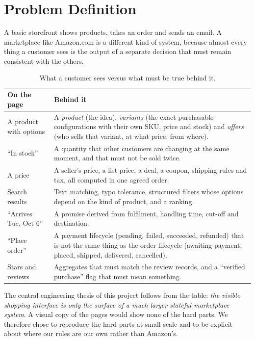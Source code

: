 \chapter{Problem Definition}
\label{ch:problem}

A basic storefront shows products, takes an order and sends an email. A marketplace like Amazon.com is a different kind of system, because almost every thing a customer sees is the output of a separate decision that must remain consistent with the others.

\begin{table}[H]
\centering
\caption{What a customer sees versus what must be true behind it.}
\label{tab:surface}
\small
\begin{tabularx}{\linewidth}{@{}lX@{}}
\toprule
On the page & Behind it \\
\midrule
A product with options & A \emph{product} (the idea), \emph{variants} (the exact purchasable configurations with their own SKU, price and stock) and \emph{offers} (who sells that variant, at what price, from where). \\
``In stock'' & A quantity that other customers are changing at the same moment, and that must not be sold twice. \\
A price & A seller's price, a list price, a deal, a coupon, shipping rules and tax, all computed in one agreed order. \\
Search results & Text matching, typo tolerance, structured filters whose options depend on the kind of product, and a ranking. \\
``Arrives Tue, Oct 6'' & A promise derived from fulfilment, handling time, cut-off and destination. \\
``Place order'' & A payment lifecycle (pending, failed, succeeded, refunded) that is not the same thing as the order lifecycle (awaiting payment, placed, shipped, delivered, cancelled). \\
Stars and reviews & Aggregates that must match the review records, and a ``verified purchase'' flag that must mean something. \\
\bottomrule
\end{tabularx}
\end{table}

The central engineering thesis of this project follows from the table: \emph{the visible shopping interface is only the surface of a much larger stateful marketplace system}. A visual copy of the pages would show none of the hard parts. We therefore chose to reproduce the hard parts at small scale and to be explicit about where our rules are our own rather than Amazon's.

